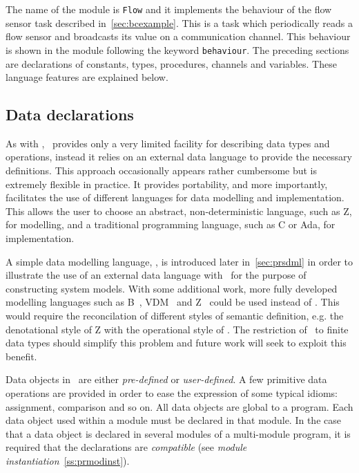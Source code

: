 The name of the module is {\tt Flow} and it implements the
behaviour of the flow sensor task described in~\Sec\ref{sec:bcexample}.
This is a task which periodically reads a flow sensor
and broadcasts its value on a communication channel. This behaviour is
shown in the module following the keyword {\tt behaviour}. The preceding 
sections are declarations of constants, types, procedures,
channels and variables. These language features are explained below.

\subsection{Data declarations}\label{ss:prdatadecls}
As with \esterel, \candle\ provides only a very limited facility for
describing data types and operations, instead it relies on an external
data language to provide the necessary definitions.  This approach
occasionally appears rather cumbersome but is extremely flexible in
practice. It provides portability, and more importantly, facilitates
the use of different languages for data modelling and
implementation. This allows the user to choose an abstract,
non-deterministic language, such as Z, for modelling, and a
traditional programming language, such as C or Ada, for
implementation.

A simple data modelling language, \sdml, is introduced later
in~\Sec\ref{sec:prsdml} in order to illustrate the use of an external
data language with \candle\ for the purpose of constructing system
models. With some additional work, more fully developed modelling
languages such as B~\cite{abr:96}, VDM~\cite{jon:90} and
Z~\cite{spi:88} could be used instead of \sdml. This would require the
reconcilation of different styles of semantic definition, e.g. the
denotational style of Z with the operational style of \bcandle. The
restriction of \candle\ to finite data types should simplify this problem
and future work will seek to exploit this benefit.

Data objects in \candle\ are either \emph{pre-defined} or
\emph{user-defined}. A few primitive data operations are provided in order 
to ease the expression of some typical idioms: assignment, comparison
and so on. All data objects are global to a program. Each data object
used within a module must be declared in that module. In the case that a 
data object is declared in several modules of a multi-module program,
it is required that the declarations are \emph{compatible} (see
\emph{module instantiation}~\Sec\ref{ss:prmodinst}).

